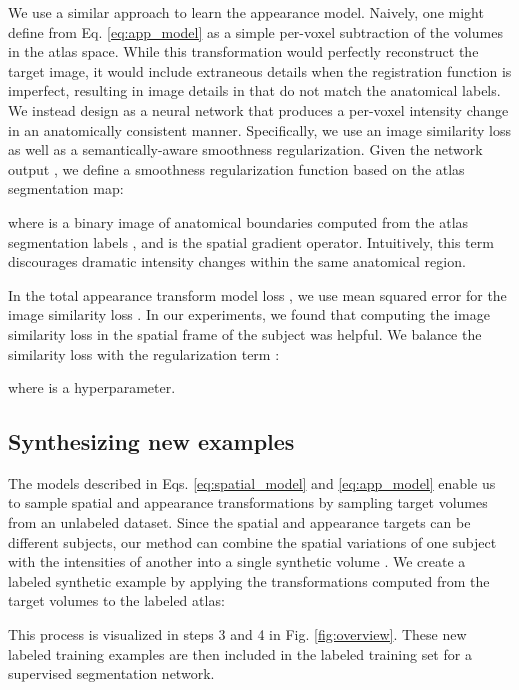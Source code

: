 \documentclass[10pt,twocolumn,letterpaper]{article}
\begin{document}
We use a similar approach to learn the appearance model. Naively, one might define  from Eq. \eqref{eq:app_model} as a simple per-voxel subtraction of the volumes in the atlas space. While this transformation would perfectly reconstruct the target image, it would include extraneous details when the registration function  is imperfect, resulting in image details in  that do not match the anatomical labels. We instead design  as a neural network that produces a per-voxel intensity change in an anatomically consistent manner. Specifically, we use an image similarity loss as well as a semantically-aware smoothness regularization. Given the network output , we define a smoothness regularization function based on the atlas segmentation map:
\vspace{-2pt}

where  is a binary image of anatomical boundaries computed from the atlas segmentation labels , and  is the spatial gradient operator. Intuitively, this term discourages dramatic intensity changes within the same anatomical region. 

In the total appearance transform model loss , we use mean squared error for the image similarity loss . In our experiments, we found that computing the image similarity loss in the spatial frame of the subject was helpful. We balance the similarity loss with the regularization term  :
\vspace{-1pt}

where  is a hyperparameter.









\subsection{Synthesizing new examples}\label{sec:methods_sampling}
The models described in Eqs. \eqref{eq:spatial_model} and \eqref{eq:app_model} enable us to sample spatial and appearance transformations  by sampling target volumes  from an unlabeled dataset. Since the spatial and appearance targets can be different subjects, our method can combine the spatial variations of one subject with the intensities of another into a single synthetic volume . We create a labeled synthetic example by applying the transformations computed from the target volumes to the labeled atlas: 
\vspace{-1pt}

This process is visualized in steps 3 and 4 in Fig. \ref{fig:overview}. 
These new labeled training examples are then included in the labeled training set for a supervised segmentation network.
\end{document}
